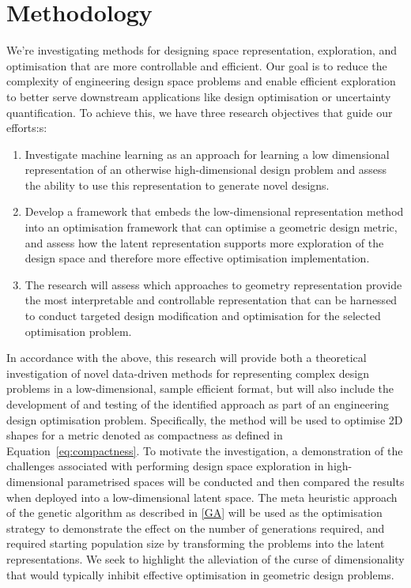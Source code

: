 \documentclass{article}
\begin{document}
\section{Methodology}
We’re investigating methods for designing space representation, exploration, and optimisation that are more controllable and efficient. Our goal is to reduce the complexity of engineering design space problems and enable efficient exploration to better serve downstream applications like design optimisation or uncertainty quantification. To achieve this, we have three research objectives that guide our efforts:s:
\begin{enumerate}
    \item Investigate machine learning as an approach for learning a low dimensional representation of an otherwise high-dimensional design problem and assess the ability to use this representation to generate novel designs.
    \item Develop a framework that embeds the low-dimensional representation method into an optimisation framework that can optimise a geometric design metric, and assess how the latent representation supports more exploration of the design space and therefore more effective optimisation implementation.
    \item The research will assess which approaches to geometry representation provide the most interpretable and controllable representation that can be harnessed to conduct targeted design modification and optimisation for the selected optimisation problem.
\end{enumerate}

In accordance with the above, this research will provide both a theoretical investigation of novel data-driven methods for representing complex design problems in a low-dimensional, sample efficient format, but will also include the development of and testing of the identified approach as part of an engineering design optimisation problem. Specifically, the method will be used to optimise 2D shapes for a metric denoted as compactness as defined in Equation~\eqref{eq:compactness}. To motivate the investigation, a demonstration of the challenges associated with performing design space exploration in high-dimensional parametrised spaces will be conducted and then compared the results when deployed into a low-dimensional latent space. The meta heuristic approach of the genetic algorithm as described in \ref{GA} will be used  as the optimisation strategy to demonstrate the effect on the number of generations required, and required starting population size by transforming the problems into the latent representations. We seek to highlight the alleviation of the curse of dimensionality that would typically inhibit effective optimisation in geometric design problems.
\end{document}
